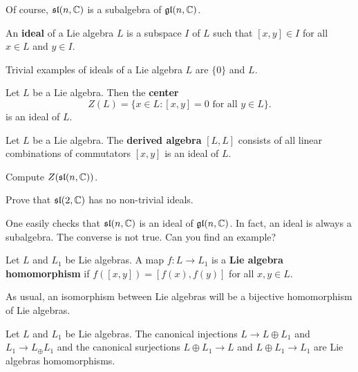 Of course, $\mathfrak{sl}(n,\mathbb{C})$ is a subalgebra of $\mathfrak{gl}(n,\mathbb{C})$. 

\begin{definition}
    An \textbf{ideal} of a Lie algebra $L$ is a subspace $I$ of $L$ 
    such that $[x,y]\in I$ for all $x\in L$ and $y\in I$. 
\end{definition}

Trivial examples of ideals of a Lie algebra $L$ are
$\{0\}$ and $L$.

\begin{example}
    Let $L$ be a Lie algebra. Then 
    the \textbf{center} 
    \[
    Z(L)=\{x\in L:[x,y]=0\text{ for all $y\in L$}\}.
    \]
    is an ideal of $L$. 
\end{example}

\begin{example}
    Let $L$ be a Lie algebra. 
    The \textbf{derived algebra} $[L,L]$
    consists of all linear combinations of commutators $[x,y]$ 
    is an ideal of $L$. 
\end{example}

\begin{exercise}
    Compute $Z(\mathfrak{sl}(n,\mathbb{C}))$. 
\end{exercise}

\begin{exercise}
    Prove that $\mathfrak{sl}(2,\mathbb{C})$ has no non-trivial ideals. 
\end{exercise}

One easily checks that $\mathfrak{sl}(n,\mathbb{C})$ is an ideal of $\mathfrak{gl}(n,\mathbb{C})$. In fact, 
an ideal is always a subalgebra. The converse is not true. 
Can you find an example?

\begin{definition}
    Let $L$ and $L_1$ be Lie algebras. A map $f\colon L\to L_1$ is a 
    \textbf{Lie algebra homomorphism} if $f([x,y])=[f(x),f(y)]$ for all
    $x,y\in L$. 
\end{definition}

As usual, an isomorphism between Lie algebras will be
a bijective homomorphism of Lie algebras. 

\begin{example}
    Let $L$ and $L_1$ be Lie algebras. The canonical injections
    $L\to L\oplus L_1$ and $L_1\to L_\oplus L_1$ and
    the canonical surjections $L\oplus L_1\to L$ and 
    $L\oplus L_1\to L_1$ are Lie algebras homomorphisms.  
\end{example}

